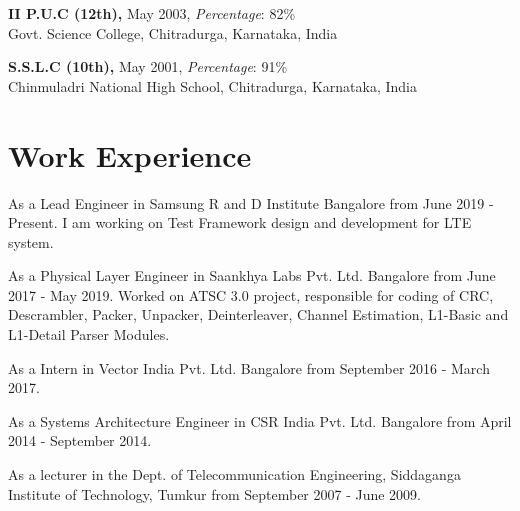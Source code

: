 \documentclass[line]{resume}
\begin{document}
{\begin{resume}
    \textbf{II P.U.C (12th),} May 2003, \textit{Percentage}: 82\% \\%
    {Govt. Science College}, Chitradurga, Karnataka, India \vspace{2mm}%
         
    
    \textbf{S.S.L.C (10th),} May 2001, \textit{Percentage}: 91\% \\%
    {Chinmuladri National High School}, Chitradurga, Karnataka, India %
    
    
       \section{\mysidestyle Work Experience} \vspace{4mm}
        \begin{list2}
		\item As a Lead Engineer in Samsung R and D Institute Bangalore from June 2019 - Present. I am working on Test 
		      Framework design and development for LTE system.
		\item As a Physical Layer Engineer in Saankhya Labs Pvt. Ltd. Bangalore from June 2017 - May 2019. Worked on
		       ATSC 3.0 project, responsible for coding of CRC, Descrambler, Packer, Unpacker, Deinterleaver, Channel 
			   Estimation, L1-Basic and L1-Detail Parser Modules.
		\item As a Intern in Vector India Pvt. Ltd. Bangalore from September 2016 - March 2017.
        \item As a Systems Architecture Engineer in CSR India Pvt. Ltd. Bangalore from April 2014 - September 2014.			   
         \item As a lecturer in the Dept. of Telecommunication Engineering, Siddaganga Institute of Technology, Tumkur
                from September 2007 - June 2009.
        

\end{list2}
\end{resume}}
\end{document}

